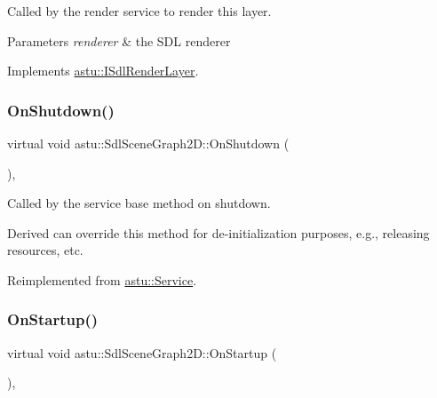Called by the render service to render this layer.


\begin{DoxyParams}{Parameters}
{\em renderer} & the S\+DL renderer \\
\hline
\end{DoxyParams}


Implements \hyperlink{classastu_1_1ISdlRenderLayer_a18af53e17e7f6f945817ad3e8b8ecc87}{astu\+::\+I\+Sdl\+Render\+Layer}.

\mbox{\label{classastu_1_1SdlSceneGraph2D_a9d28b32e69cb7901ec2b05091b750642}} 
\subsubsection{\texorpdfstring{On\+Shutdown()}{OnShutdown()}}
{\footnotesize\ttfamily virtual void astu\+::\+Sdl\+Scene\+Graph2\+D\+::\+On\+Shutdown (\begin{DoxyParamCaption}{ }\end{DoxyParamCaption})\hspace{0.3cm}{\ttfamily [override]}, {\ttfamily [virtual]}}

Called by the service base method on shutdown.

Derived can override this method for de-\/initialization purposes, e.\+g., releasing resources, etc. 

Reimplemented from \hyperlink{classastu_1_1Service_a1e1dff727df791c57fae782d8a613c5f}{astu\+::\+Service}.

\mbox{\label{classastu_1_1SdlSceneGraph2D_a141138f2cbda543b9bcbd0803e0ebd19}} 
\subsubsection{\texorpdfstring{On\+Startup()}{OnStartup()}}
{\footnotesize\ttfamily virtual void astu\+::\+Sdl\+Scene\+Graph2\+D\+::\+On\+Startup (\begin{DoxyParamCaption}{ }\end{DoxyParamCaption})\hspace{0.3cm}{\ttfamily [override]}, {\ttfamily [virtual]}}

